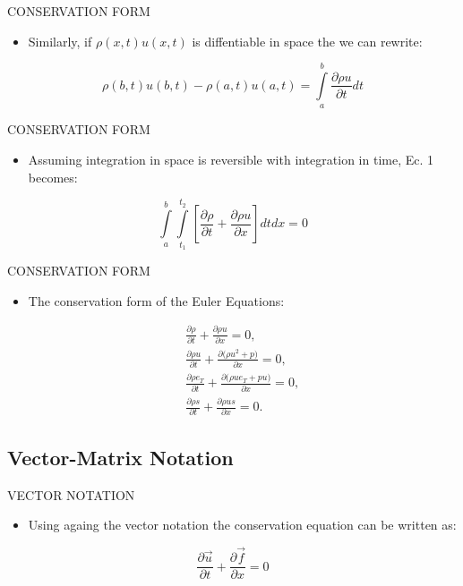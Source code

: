 \documentclass{beamer}
\begin{document}
\begin{frame}{CONSERVATION FORM}
  \begin{itemize}
   \item Similarly, if $\rho(x,t)u(x,t)$ is diffentiable in space the we can rewrite:
  \end{itemize}
  \begin{equation}
    {\rho}(b,t)u(b,t)-{\rho}(a,t)u(a,t)=\int\limits_a^b \frac{\partial{{\rho}{u}}}{\partial{t}}dt
  \end{equation}
\end{frame}

\begin{frame}{CONSERVATION FORM}
  \begin{itemize}
   \item Assuming integration in space is reversible with integration in time, Ec. 1 becomes:
  \end{itemize}
  \begin{equation}
    \int\limits_a^b \int\limits_{t_1}^{t_2} \left[ \frac{\partial{\rho}}{\partial{t}} +\frac{\partial{{\rho}{u}}}{\partial{x}} \right] dtdx = 0
  \end{equation} 
\end{frame}

\begin{frame}{CONSERVATION FORM}
  \begin{itemize}
   \item The conservation form of the Euler Equations:
  \end{itemize}
  \begin{eqnarray}
    &&\frac{\partial{\rho}}{\partial{t}}+\frac{\partial{{\rho}{u}}}{\partial{x}}=0, \\
    &&\frac{\partial{{\rho}u}}{\partial{t}}+\frac{\partial{({\rho}{u^2}+p})}{\partial{x}}=0, \\
    &&\frac{\partial{\rho}e_T}{\partial{t}}+\frac{\partial{({\rho}{u}e_T+pu})}{\partial{x}}=0, \\
    &&\frac{\partial{\rho}s}{\partial{t}}+\frac{\partial{{\rho}{u}s}}{\partial{x}}=0.
  \end{eqnarray} 
\end{frame}

\subsection{Vector-Matrix Notation}
  
\begin{frame}{VECTOR NOTATION}
  \begin{itemize}
   \item Using againg the vector notation the conservation equation can be written as:
  \end{itemize}
  \begin{equation}
   \frac{\partial{\vec{u}}}{\partial{t}}+\frac{\partial{\vec{f}}}{\partial{x}}=0
  \end{equation}
\end{frame}
\end{document}
